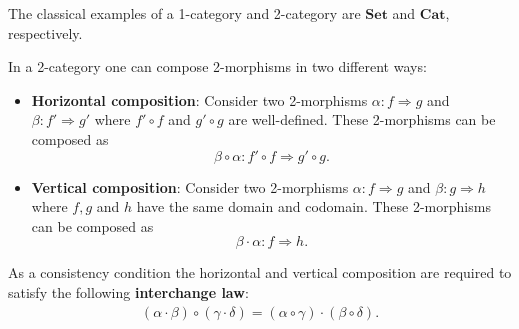     \begin{example}
        The classical examples of a 1-category and 2-category are $\mathbf{Set}$ and $\mathbf{Cat}$, respectively.
    \end{example}

    \begin{property}
        In a 2-category one can compose 2-morphisms in two different ways:
        \begin{itemize}
            \item\textbf{Horizontal composition}:
                Consider two 2-morphisms $\alpha:f\Rightarrow g$ and $\beta:f'\Rightarrow g'$ where $f'\circ f$ and $g'\circ g$ are well-defined. These 2-morphisms can be composed as \[\beta\circ\alpha: f'\circ f\Rightarrow g'\circ g.\]
            \item\textbf{Vertical composition}:
                Consider two 2-morphisms $\alpha:f\Rightarrow g$ and $\beta:g\Rightarrow h$ where $f,g$ and $h$ have the same domain and codomain. These 2-morphisms can be composed as \[\beta\cdot\alpha:f\Rightarrow h.\]
        \end{itemize}
        As a consistency condition the horizontal and vertical composition are required to satisfy the following \textbf{interchange law}:
        \begin{gather}
            (\alpha\cdot\beta)\circ(\gamma\cdot\delta) = (\alpha\circ\gamma)\cdot(\beta\circ\delta).
        \end{gather}
    \end{property}


